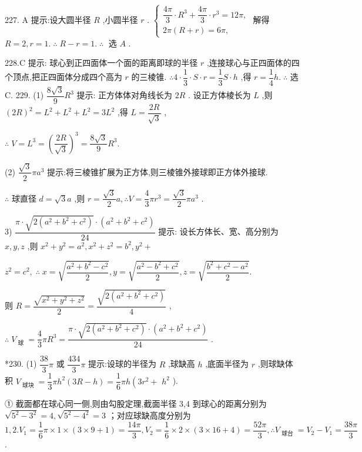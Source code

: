 227. A 提示:设大圆半径 $R$ ,小圆半径 $r$ . $\left\{  \begin{array}{l} \dfrac{4\pi }{3} \cdot  {R}^{3} + \dfrac{4\pi }{3} \cdot  {r}^{3} = {12\pi }, \\  {2\pi }\left( {R + r}\right)  = {6\pi }, \end{array}\right.$ 解得 $R = 2,r = 1.\;\therefore \;R - r = 1.\;\therefore \;$ 选 $A$ .

228.C 提示: 球心到正四面体一个面的距离即球的半径 $r$ ,连接球心与正四面体的四个顶点,把正四面体分成四个高为 $r$ 的三棱锥. $\therefore 4 \cdot  \dfrac{1}{3} \cdot  S \cdot  r = \dfrac{1}{3}S \cdot  h$ ,得 $r = \dfrac{1}{4}h.\;\therefore$ 选 C. 229. (1) $\dfrac{8\sqrt{3}}{9}{R}^{3}$ 提示: 正方体体对角线长为 ${2R}$ . 设正方体棱长为 $L$ ,则 ${\left( 2R\right) }^{2} = {L}^{2} + {L}^{2} + {L}^{2} = 3{L}^{2}$ ,得 $L = \dfrac{2R}{\sqrt{3}}$ ,

$\therefore \;V = {L}^{3} = {\left( \dfrac{2R}{\sqrt{3}}\right) }^{3} = \dfrac{8\sqrt{3}}{9}{R}^{3}.$

(2) $\dfrac{\sqrt{3}}{2}\pi {a}^{3}$ 提示:将三棱锥扩展为正方体,则三棱锥外接球即正方体外接球.

$\therefore$ 球直径 $d = \sqrt{3}a$ ,则 $r = \dfrac{\sqrt{3}}{2}a,\therefore V = \dfrac{4}{3}\pi {r}^{3} = \dfrac{\sqrt{3}}{2}\pi {a}^{3}$ .

3) $\dfrac{\pi  \cdot  \sqrt{2\left( {{a}^{2} + {b}^{2} + {c}^{2}}\right) } \cdot  \left( {{a}^{2} + {b}^{2} + {c}^{2}}\right) }{24}$ 提示: 设长方体长、宽、高分别为 $x,y,z$ ,则 ${x}^{2} + {y}^{2} = {a}^{2},{x}^{2} + {z}^{2} = {b}^{2},{y}^{2} +$

${z}^{2} = {c}^{2},\;\therefore \;x = \sqrt{\dfrac{{a}^{2} + {b}^{2} - {c}^{2}}{2}},y = \sqrt{\dfrac{{a}^{2} - {b}^{2} + {c}^{2}}{2}},z = \sqrt{\dfrac{{b}^{2} + {c}^{2} - {a}^{2}}{2}}.$

则 $R = \dfrac{\sqrt{{x}^{2} + {y}^{2} + {z}^{2}}}{2} = \dfrac{\sqrt{2\left( {{a}^{2} + {b}^{2} + {c}^{2}}\right) }}{4}$ ,

$\therefore \;{V}_{\text{ 球 }} = \dfrac{4}{3}\pi {R}^{3} = \dfrac{\pi  \cdot  \sqrt{2\left( {{a}^{2} + {b}^{2} + {c}^{2}}\right) } \cdot  \left( {{a}^{2} + {b}^{2} + {c}^{2}}\right) }{24}$ .

*230. (1) $\dfrac{38}{3}\pi$ 或 $\dfrac{434}{3}\pi$ 提示:设球的半径为 $R$ ,球缺高 $h$ ,底面半径为 $r$ ,则球缺体积 ${V}_{\text{ 球块 }} = \dfrac{1}{3}\pi {h}^{2}\left( {{3R} - h}\right)  = \dfrac{1}{6}{\pi h}\left( {3{r}^{2} + }\right.$  ${h}^{2}$ ).

① 截面都在球心同一侧,则由勾股定理,截面半径 3,4 到球心的距离分别为 $\sqrt{{5}^{2} - {3}^{2}} = 4,\sqrt{{5}^{2} - {4}^{2}} = 3$ ；对应球缺高度分别为 $1,2.{V}_{1} = \dfrac{1}{6}\pi  \times  1 \times  \left( {3 \times  9 + 1}\right)  = \dfrac{14\pi }{3},{V}_{2} = \dfrac{1}{6} \times  2 \times  \left( {3 \times  {16} + 4}\right)  = \dfrac{52\pi }{3},\therefore {V}_{\text{ 球台 }} = {V}_{2} - {V}_{1} = \dfrac{38\pi }{3}$ .

